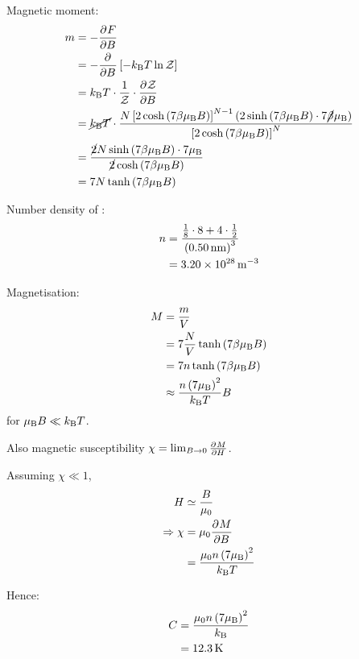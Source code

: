 \begin{parts}
	Magnetic moment:
	\begin{align*}
		m &= -\frac{\partial^{}{F}}{\partial{}{B}^{}} \\
		&= -\frac{\partial^{}}{\partial{}{B}^{}} \left[-k_\mathrm{B} T \ln \mathcal{Z}\right] \\
		&= k_\mathrm{B} T \cdot \frac{1}{\mathcal{Z}} \cdot \frac{\partial^{}{\mathcal{Z}}}{\partial{}{B}^{}} \\
		&= \cancel{k_\mathrm{B} T} \cdot \frac{N \left[2 \cosh\left(7\beta\mu_\mathrm{B} B\right)\right]^{N-1} \left(2 \sinh\left(7\beta\mu_\mathrm{B} B\right) \cdot 7\cancel{\beta}\mu_\mathrm{B}\right)}{\left[2 \cosh\left(7\beta\mu_\mathrm{B} B\right)\right]^N} \\
		&= \frac{\cancel{2}N \sinh\left(7\beta\mu_\mathrm{B} B\right) \cdot 7\mu_\mathrm{B}}{\cancel{2} \cosh\left(7\beta\mu_\mathrm{B} B\right)} \\
		&= 7N \tanh\left(7\beta\mu_\mathrm{B} B\right)
	\end{align*}
	
	Number density of :
	\begin{align*}
		n &= \frac{\frac{1}{8} \cdot 8 + 4 \cdot \frac{1}{2}}{\left(\SI{0.50}{\nano\metre}\right)^3} \\
		&= \SI{3.20e28}{\per\metre\cubed}
	\end{align*}
	
	Magnetisation:
	\begin{align*}
		M &= \frac{m}{V} \\
		&= 7\frac{N}{V} \tanh\left(7\beta\mu_\mathrm{B} B\right) \\
		&= 7n \tanh\left(7\beta\mu_\mathrm{B} B\right) \\
		&\approx \frac{n \left(7\mu_\mathrm{B}\right)^2}{k_\mathrm{B} T} B
	\end{align*}
	for $\mu_\mathrm{B} B \ll k_\mathrm{B} T$.
	
	Also magnetic susceptibility $\chi = \lim_{B \to 0} \frac{\partial^{}{M}}{\partial{}{H}^{}}$.
	
	Assuming $\chi \ll 1$,
	\begin{align*}
		H &\simeq \frac{B}{\mu_{0}} \\
		\Rightarrow \chi &= \mu_{0} \frac{\partial^{}{M}}{\partial{}{B}^{}} \\
		&= \frac{\mu_{0} n \left(7\mu_\mathrm{B}\right)^2}{k_\mathrm{B} T}
	\end{align*}
	
	Hence:
	\begin{align*}
		C &= \frac{\mu_{0} n \left(7\mu_\mathrm{B}\right)^2}{k_\mathrm{B}} \\
		&= \SI{12.3}{\kelvin}
	\end{align*}
	

\end{parts}
